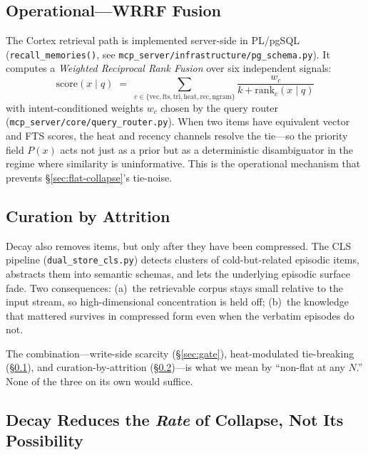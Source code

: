 \documentclass[11pt]{article}
\begin{document}
\subsection{Operational---WRRF Fusion}
\label{sec:wrrf}

The Cortex retrieval path is implemented server-side in PL/pgSQL
(\texttt{recall\_memories()}, see
\texttt{mcp\_server/infrastructure/pg\_schema.py}).  It computes a
\emph{Weighted Reciprocal Rank Fusion} \citep{Cormack2009} over six
independent signals:
\begin{equation}
\mathrm{score}(x \mid q) \;=\;
\sum_{c \in \{\mathrm{vec}, \mathrm{fts}, \mathrm{tri}, \mathrm{heat}, \mathrm{rec}, \mathrm{ngram}\}}
\frac{w_c}{k + \mathrm{rank}_c(x \mid q)}
\label{eq:wrrf}
\end{equation}
with intent-conditioned weights $w_c$ chosen by the query router
(\texttt{mcp\_server/core/query\_router.py}).  When two items have
equivalent vector and FTS scores, the heat and recency channels
resolve the tie---so the priority field $P(x)$ acts not just as a
prior but as a deterministic disambiguator in the regime where
similarity is uninformative.  This is the operational mechanism
that prevents \S\ref{sec:flat-collapse}'s tie-noise.

\subsection{Curation by Attrition}
\label{sec:curation}

Decay also removes items, but only after they have been compressed.
The CLS pipeline (\texttt{dual\_store\_cls.py}) detects clusters of
cold-but-related episodic items, abstracts them into semantic
schemas, and lets the underlying episodic surface fade.  Two
consequences: (a)~the retrievable corpus stays small relative to
the input stream, so high-dimensional concentration is held off;
(b)~the knowledge that mattered survives in compressed form even
when the verbatim episodes do not.

The combination---write-side scarcity (\S\ref{sec:gate}),
heat-modulated tie-breaking (\S\ref{sec:wrrf}), and
curation-by-attrition (\S\ref{sec:curation})---is what we mean by
``non-flat at any $N$.''  None of the three on its own would
suffice.

\subsection{Decay Reduces the \emph{Rate} of Collapse, Not Its Possibility}
\label{sec:rate-not-possibility}
\end{document}
